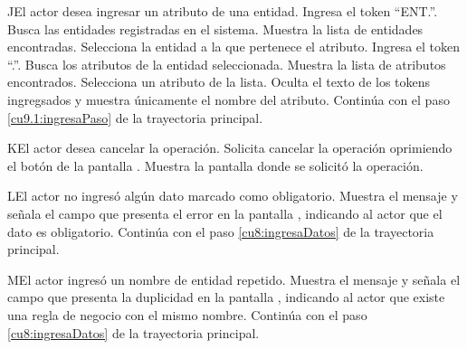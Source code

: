  \begin{UCtrayectoriaA}{J}{El actor desea ingresar un atributo de una entidad.}
 	\UCpaso[\UCactor] Ingresa el token ``ENT.''.
 	\UCpaso[\UCsist] Busca las entidades registradas en el sistema. 
 	\UCpaso[\UCsist] Muestra la lista de entidades encontradas.
 	\UCpaso[\UCactor] Selecciona la entidad a la que pertenece el atributo.
  	\UCpaso[\UCactor] Ingresa el token ``.''.
  	\UCpaso[\UCsist] Busca los atributos de la entidad seleccionada.
  	\UCpaso[\UCsist] Muestra la lista de atributos encontrados.
 	\UCpaso[\UCactor] Selecciona un atributo de la lista.
  	\UCpaso[\UCsist] Oculta el texto de los tokens ingregsados y muestra únicamente el nombre del atributo.
    \UCpaso[] Continúa con el paso \ref{cu9.1:ingresaPaso} de la trayectoria principal.
 \end{UCtrayectoriaA}
 \begin{UCtrayectoriaA}{K}{El actor desea cancelar la operación.}
    \UCpaso[\UCactor] Solicita cancelar la operación oprimiendo el botón  de la pantalla .
    \UCpaso[\UCsist] Muestra la pantalla donde se solicitó la operación.
 \end{UCtrayectoriaA}
 \begin{UCtrayectoriaA}{L}{El actor no ingresó algún dato marcado como obligatorio.}
    \UCpaso[\UCsist] Muestra el mensaje  y señala el campo que presenta el error en la pantalla 
	    , indicando al actor que el dato es obligatorio.
    \UCpaso[] Continúa con el paso \ref{cu8:ingresaDatos} de la trayectoria principal.
 \end{UCtrayectoriaA}
 \begin{UCtrayectoriaA}{M}{El actor ingresó un nombre de entidad repetido.}
    \UCpaso[\UCsist] Muestra el mensaje  y señala el campo que presenta la duplicidad en la pantalla 
	    , indicando al actor que existe una regla de negocio con el mismo nombre.
    \UCpaso[] Continúa con el paso \ref{cu8:ingresaDatos} de la trayectoria principal.
 \end{UCtrayectoriaA}
 
